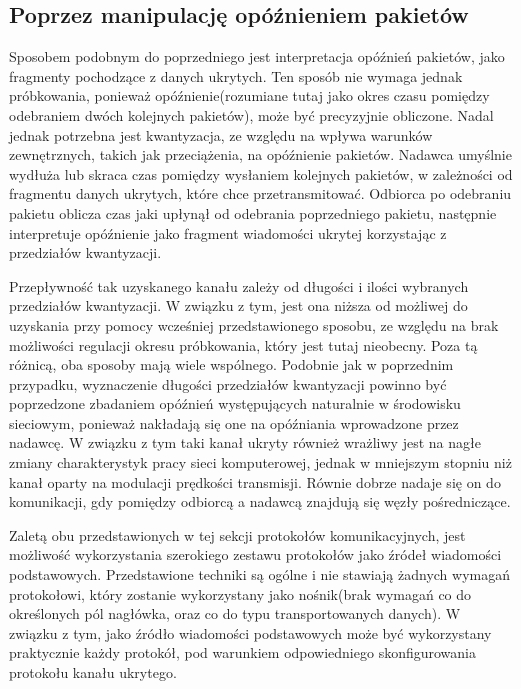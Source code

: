 \documentclass[a4paper, twoside, 12pt]{report}
\begin{document}
        \subsection{Poprzez manipulację opóźnieniem pakietów}
        Sposobem podobnym do poprzedniego jest interpretacja opóźnień pakietów,
        jako fragmenty pochodzące z danych ukrytych.\cite{IPDELAYCHANNEL} Ten sposób nie wymaga jednak próbkowania,
        ponieważ opóźnienie(rozumiane tutaj jako okres czasu pomiędzy odebraniem dwóch
        kolejnych pakietów), może być precyzyjnie obliczone. Nadal jednak potrzebna
        jest kwantyzacja, ze względu na wpływa warunków zewnętrznych, takich jak przeciążenia,
        na opóźnienie pakietów. Nadawca umyślnie wydłuża lub skraca czas pomiędzy
        wysłaniem kolejnych pakietów, w zależności od fragmentu danych ukrytych,
        które chce przetransmitować. Odbiorca po odebraniu pakietu oblicza czas jaki
        upłynął od odebrania poprzedniego pakietu, następnie
        interpretuje opóźnienie jako fragment wiadomości ukrytej korzystając z
        przedziałów kwantyzacji.

        Przepływność tak uzyskanego kanału zależy od długości i ilości wybranych
        przedziałów kwantyzacji. W związku z tym, jest ona niższa od możliwej do
        uzyskania przy pomocy wcześniej przedstawionego sposobu, ze względu na brak
        możliwości regulacji okresu próbkowania, który jest tutaj nieobecny. Poza tą różnicą, oba sposoby mają
        wiele wspólnego. Podobnie jak w poprzednim przypadku, wyznaczenie długości
        przedziałów kwantyzacji powinno być poprzedzone zbadaniem opóźnień występujących
        naturalnie w środowisku sieciowym, ponieważ nakładają się one na opóźniania
        wprowadzone przez nadawcę. W związku z tym taki kanał ukryty również wrażliwy jest
        na nagłe zmiany charakterystyk pracy sieci komputerowej, jednak w mniejszym
        stopniu niż kanał oparty na modulacji prędkości transmisji. Równie dobrze
        nadaje się on do komunikacji, gdy pomiędzy odbiorcą a nadawcą znajdują się
        węzły pośredniczące.

        Zaletą obu przedstawionych w tej sekcji protokołów komunikacyjnych,
        jest możliwość wykorzystania szerokiego zestawu protokołów jako
        źródeł wiadomości podstawowych. Przedstawione techniki są ogólne i
        nie stawiają żadnych wymagań protokołowi, który zostanie wykorzystany jako
        nośnik(brak wymagań co do określonych pól nagłówka, oraz co do typu transportowanych danych).
        W związku z tym, jako źródło wiadomości podstawowych może być wykorzystany
        praktycznie każdy protokół, pod warunkiem odpowiedniego skonfigurowania
        protokołu kanału ukrytego.
\end{document}
